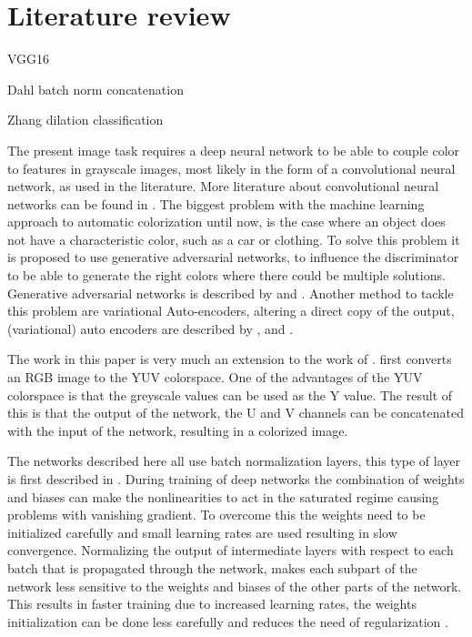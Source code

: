 \section{Literature review}

VGG16




Dahl
batch norm
concatenation




Zhang
dilation
classification



The present image task requires a deep neural network to be able to couple color to features in grayscale images, most likely in the form of a convolutional neural network, as used in the literature. More literature about convolutional neural networks can be found in \cite{GoodfellowBOOK}. The biggest problem with the machine learning approach to automatic colorization until now, is the case where an object does not have a characteristic color, such as a car or clothing. To solve this problem it is proposed to use generative adversarial networks, to influence the discriminator to be able to generate the right colors where there could be multiple solutions. Generative adversarial networks is described by \cite{Goodfellow} and \cite{Radford}. Another method to tackle this problem are variational Auto-encoders, altering a direct copy of the output, (variational) auto encoders are described by \cite{Gregor}, \cite{Kingma} and \cite{GoodfellowBOOK}.

The work in this paper is very much an extension to the work of \cite{Dahl}. \cite{Dahl} first converts an RGB image to the YUV colorspace. One of the advantages of the YUV colorspace is that the greyscale values can be used as the Y value. The result of this is that the output of the network, the U and V channels can be concatenated with the input of the network, resulting in a colorized image.






The networks described here all use batch normalization layers, this type of layer is first described in \cite{ioffe2015batch}. During training of deep networks the combination of weights and biases can make the nonlinearities to act in the saturated regime causing problems with vanishing gradient. To overcome this the weights need to be initialized carefully and small learning rates are used resulting in slow convergence. Normalizing the output of intermediate layers with respect to each batch that is propagated through the network, makes each subpart of the network less sensitive to the weights and biases of the other parts of the network. This results in faster training due to increased learning rates, the weights initialization can be done less carefully and reduces the need of regularization \cite{ioffe2015batch}.






